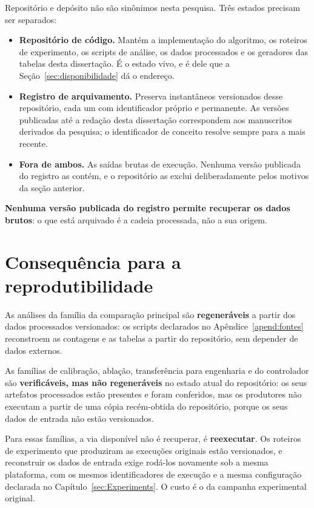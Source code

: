 Repositório e depósito não são sinônimos nesta pesquisa. Três estados precisam ser separados:

\begin{itemize}
\item \textbf{Repositório de código.} Mantém a implementação do algoritmo, os roteiros de experimento, os scripts de análise, os dados processados e os geradores das tabelas desta dissertação. É o estado vivo, e é dele que a Seção~\ref{sec:disponibilidade} dá o endereço.

\item \textbf{Registro de arquivamento.} Preserva instantâneos versionados desse repositório, cada um com identificador próprio e permanente. As versões publicadas até a redação desta dissertação correspondem aos manuscritos derivados da pesquisa; o identificador de conceito resolve sempre para a mais recente.

\item \textbf{Fora de ambos.} As saídas brutas de execução. Nenhuma versão publicada do registro as contém, e o repositório as exclui deliberadamente pelos motivos da seção anterior.
\end{itemize}

\textbf{Nenhuma versão publicada do registro permite recuperar os dados brutos}: o que está arquivado é a cadeia processada, não a sua origem.

\section{Consequência para a reprodutibilidade}

As análises da família da comparação principal são \textbf{regeneráveis} a partir dos dados processados versionados: os scripts declarados no Apêndice~\ref{apend:fontes} reconstroem as contagens e as tabelas a partir do repositório, sem depender de dados externos.

As famílias de calibração, ablação, transferência para engenharia e do controlador são \textbf{verificáveis, mas não regeneráveis} no estado atual do repositório: os seus artefatos processados estão presentes e foram conferidos, mas os produtores não executam a partir de uma cópia recém-obtida do repositório, porque os seus dados de entrada não estão versionados.

Para essas famílias, a via disponível não é recuperar, é \textbf{reexecutar}. Os roteiros de experimento que produziram as execuções originais estão versionados, e reconstruir os dados de entrada exige rodá-los novamente sob a mesma plataforma, com os mesmos identificadores de execução e a mesma configuração declarada no Capítulo~\ref{sec:Experiments}. O custo é o da campanha experimental original.

